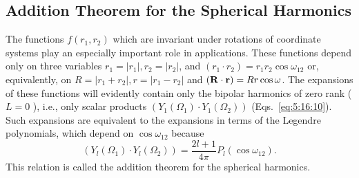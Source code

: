 \subsection{Addition Theorem for the Spherical Harmonics}\label{sec:5.17.2}
The functions $f\left(r_{1}, r_{2}\right)$ which are invariant under rotations of coordinate systems play an especially important role in applications. These functions depend only on three variables $r_{1}=\left|r_{1}\right|, r_{2}=\left|r_{2}\right|$, and $\left(r_{1} \cdot r_{2}\right)= r_{1} r_{2} \cos \omega_{12}$ or, equivalently, on $R=\left|r_{1}+r_{2}\right|, r=\left|r_{1}-r_{2}\right|$ and $(\mathbf{R} \cdot \mathbf{r})=R r \cos \omega$. The expansions of these functions will evidently contain only the bipolar harmonics of zero rank ( $L=0$ ), i.e., only scalar products $\left(Y_{1}\left(\Omega_{1}\right) \cdot Y_{1}\left(\Omega_{2}\right)\right)$ (Eqs.~\eqref{eq:5:16:10}). Such expansions are equivalent to the expansions in terms of the Legendre polynomials, which depend on $\cos \omega_{12}$ because
\begin{equation}
\left(Y_{l}\left(\Omega_{1}\right) \cdot Y_{l}\left(\Omega_{2}\right)\right)=\frac{2 l+1}{4 \pi} P_{l}\left(\cos \omega_{12}\right) . \label{eq:5:17:9}
\end{equation}
This relation is called the addition theorem for the spherical harmonics.

